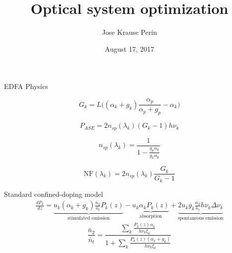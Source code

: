 \documentclass[10pt]{beamer}
\title{Optical system optimization}
\author{Jose Krause Perin}
\institute{Stanford University}
\date{August 17, 2017}
\begin{document}
\begin{frame}
  \titlepage
\end{frame}


\begin{frame}{EDFA Physics}

\begin{equation} \tag{gain}
G_k = L\bigg((\alpha_k + g_k)\frac{\alpha_p}{\alpha_p + g_p} - \alpha_k\bigg)
\end{equation}

\begin{equation} \tag{ASE PSD}
P_{ASE} = 2n_{sp}(\lambda_k)(G_k-1)h\nu_k
\end{equation}

\begin{equation} \tag{excess noise}
n_{sp}(\lambda_k) = \frac{1}{1 - \displaystyle\frac{g_p\alpha_k}{g_k\alpha_p}}
\end{equation}

\begin{equation} \tag{noise figure}
\mathrm{NF}(\lambda_k) = 2n_{sp}(\lambda_k)\frac{G_k}{G_k - 1}
\end{equation}


\end{frame}

\begin{frame}{Standard confined-doping model}
	\begin{align} \nonumber
		\frac{dP_k}{dz} = \underbrace{u_k(\alpha_k + g_k)\frac{\bar{n}_2}{\bar{n}_t}P_k(z)}_{\text{stimulated emission}} - \underbrace{u_k\alpha_kP_k(z)}_{\text{absorption}} + \underbrace{2u_kg_k\frac{\bar{n}_2}{\bar{n}_t}h\nu_k\Delta\nu_k}_{\text{spontaneous emission}}
	\end{align}
	\begin{equation} \tag{inversion coefficient}
		\frac{\bar{n}_2}{\bar{n}_t} = \displaystyle\frac{\displaystyle\sum_k \displaystyle\frac{P_k(z)\alpha_k}{h\nu_k\xi_k}}{1 + \sum_k \displaystyle\frac{P_k(z)(\alpha_k + g_k)}{h\nu_k\xi_k}}
	\end{equation}
\end{frame}
\end{document}
